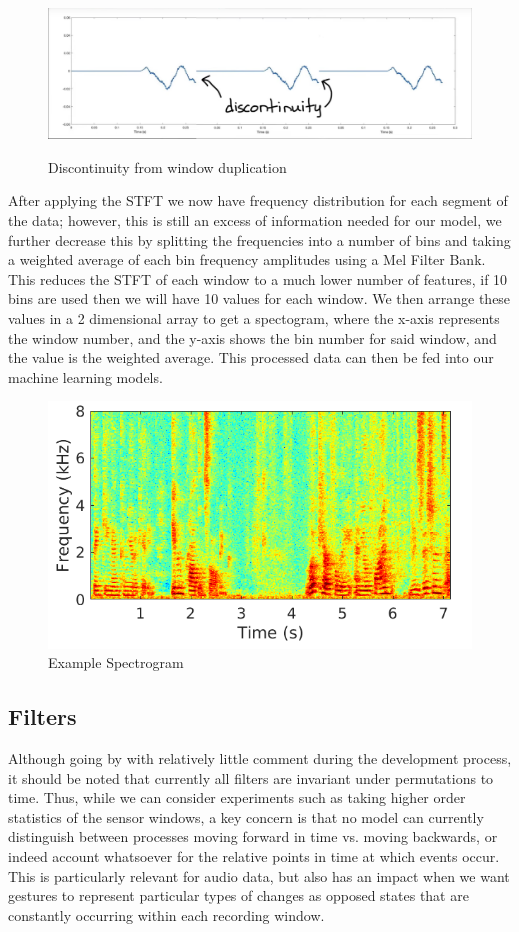 \documentclass{article}
\begin{document}
\begin{figure}[h]
    \centering
    \caption{Discontinuity from window duplication}
    \includegraphics[width=0.5\linewidth]{discontinuity example.png}
    \label{fig:discon}
\end{figure}

After applying the STFT we now have frequency distribution for each segment of the data; however, this is still an excess of information needed for our model, we further decrease this by splitting the frequencies into a number of bins and taking a weighted average of each bin frequency amplitudes using a Mel Filter Bank. This reduces the STFT of each window to a much lower number of features, if 10 bins are used then we will have 10 values for each window. We then arrange these values in a 2 dimensional array to get a spectogram, where the x-axis represents the window number, and the y-axis shows the bin number for said window, and the value is the weighted average. This processed data can then be fed into our machine learning models. \\

\begin{figure}[h]
    \centering
    \caption{Example Spectrogram}
    \includegraphics[width=0.5\linewidth]{example_spectrogram.png}
\end{figure}

\subsection{Filters}%
\label{subsec:filters}

Although going by with relatively little comment during the development process, it should be noted that currently all filters are invariant under permutations to time. Thus, while we can consider experiments such as taking higher order statistics of the sensor windows, a key concern is that no model can currently distinguish between processes moving forward in time vs. moving backwards, or indeed account whatsoever for the relative points in time at which events occur. This is particularly relevant for audio data, but also has an impact when we want gestures to represent particular types of changes as opposed states that are constantly occurring within each recording window. \\
\end{document}
